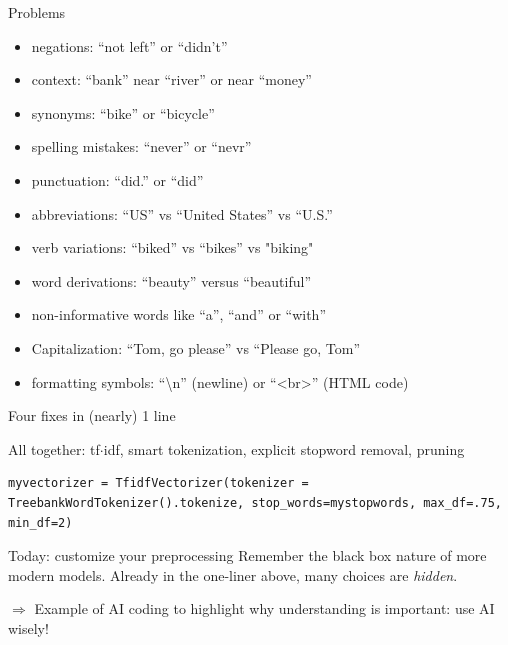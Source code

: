 \documentclass[compress]{beamer}
\begin{document}
\begin{frame}{Problems}
    \begin{itemize}
        \item negations: ``not left'' or ``didn't''
        \item context: ``bank'' near ``river'' or near ``money''
        \item synonyms: ``bike'' or ``bicycle''
        \item spelling mistakes: ``never'' or ``nevr''
        \item punctuation: ``did.'' or ``did''
        \item abbreviations: ``US'' vs ``United States'' vs ``U.S.''
        \item verb variations: ``biked'' vs ``bikes'' vs "biking"
        \item word derivations: ``beauty'' versus ``beautiful''
        \item non-informative words like ``a'', ``and'' or ``with''
        \item Capitalization: ``Tom, go please'' vs ``Please go, Tom''
        \item formatting symbols: ``\textbackslash n'' (newline) or ``<br>'' (HTML code)
    \end{itemize}
\end{frame}

\begin{frame}[fragile]{Four fixes in (nearly) 1 line}

All together: tf$\cdot$idf, smart tokenization, explicit stopword removal, pruning
\begin{lstlisting}
myvectorizer = TfidfVectorizer(tokenizer = TreebankWordTokenizer().tokenize, stop_words=mystopwords, max_df=.75, min_df=2)
\end{lstlisting}

\end{frame}

\begin{frame}{Today: customize your preprocessing}
    Remember the black box nature of more modern models.  
    Already in the one-liner above, many choices are \emph{hidden}.
    
    \vspace{1cm}
    \pause
    
    $\Rightarrow$ Example of AI coding to highlight why understanding is important: use AI wisely!
\end{frame}



\end{document}
